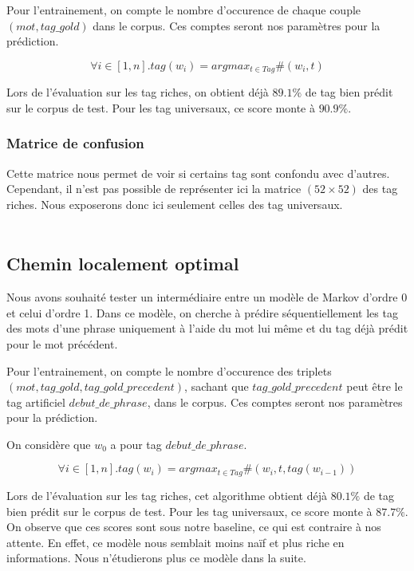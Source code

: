 \documentclass{article}
\begin{document}
Pour l'entrainement, on compte le nombre d'occurence de chaque couple $(mot,tag\_gold)$ dans le corpus. Ces comptes seront nos paramètres pour la prédiction.

$$\forall i \in [1,n] . tag(w_i) = argmax_{t \in Tag} \#(w_i,t)$$

Lors de l'évaluation sur les tag riches, on obtient déjà $89.1\%$ de tag bien prédit sur le corpus de test. Pour les tag universaux, ce score monte à $90.9\%$. 

\subsubsection{Matrice de confusion}

Cette matrice nous permet de voir si certains tag sont confondu avec d'autres. Cependant, il n'est pas possible de représenter ici la matrice $(52 \times 52)$ des tag riches. Nous exposerons donc ici seulement celles des tag universaux.

$$
\begin{array}{l|c|c|c|c|c|c|c|c|c|c|c|c}

\end{array}
$$

\subsection{Chemin localement optimal}

Nous avons souhaité tester un intermédiaire entre un modèle de Markov d'ordre 0 et celui d'ordre 1. Dans ce modèle, on cherche à prédire séquentiellement les tag des mots d'une phrase uniquement à l'aide du mot lui même et du tag déjà prédit pour le mot précédent. 

Pour l'entrainement, on compte le nombre d'occurence des triplets $(mot,tag\_gold,tag\_gold\_precedent)$, sachant que $tag\_gold\_precedent$ peut être le tag artificiel $debut\_de\_phrase$, dans le corpus. Ces comptes seront nos paramètres pour la prédiction.

On considère que $w_0$ a pour tag $debut\_de\_phrase$.

$$\forall i \in [1,n] . tag (w_i) = argmax_{t \in Tag} \#(w_i,t,tag(w_{i-1}))$$

Lors de l'évaluation sur les tag riches, cet algorithme obtient déjà $80.1\%$ de tag bien prédit sur le corpus de test. Pour les tag universaux, ce score monte à $87.7\%$. On observe que ces scores sont sous notre baseline, ce qui est contraire à nos attente. En effet, ce modèle nous semblait moins naïf et plus riche en informations. Nous n'étudierons plus ce modèle dans la suite.
\end{document}
